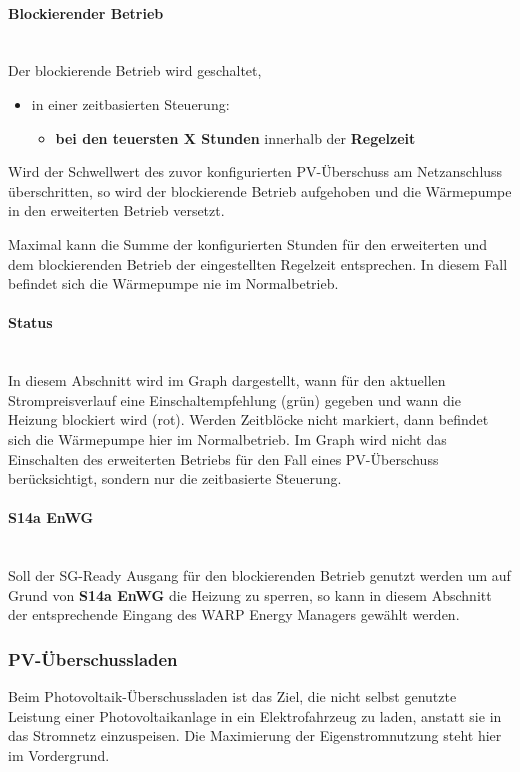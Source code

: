 \documentclass[a4paper,10pt]{article}
\newcommand{\hint}[1]{\begin{tcolorbox}[colback=boxgray,colframe=black,coltext=
white,title=Hinweis,left*=2mm,right*=2mm,boxsep=1mm,bottom=1mm,top=1mm]#1\end{tcolorbox}}
\begin{document}
\begin{multicols*}{2}
    \paragraph{Blockierender Betrieb}\ \\
    Der blockierende Betrieb wird geschaltet,
    \begin{itemize}
    \item in einer zeitbasierten Steuerung:
    \begin{itemize}
    \item \textbf{bei den teuersten X Stunden} innerhalb der \textbf{Regelzeit}
    \end{itemize}
   	\end{itemize}
    Wird der Schwellwert des zuvor konfigurierten PV-Überschuss am Netzanschluss überschritten, so wird der blockierende Betrieb aufgehoben und die Wärmepumpe in den erweiterten Betrieb versetzt.
    
    \hint{Maximal kann die Summe der konfigurierten Stunden für den erweiterten und dem blockierenden Betrieb der eingestellten Regelzeit entsprechen. In diesem Fall befindet sich die Wärmepumpe nie im Normalbetrieb.}
    
    \paragraph{Status}\ \\
    In diesem Abschnitt wird im Graph dargestellt, wann für den aktuellen Strompreisverlauf eine Einschaltempfehlung (grün) gegeben und wann die Heizung blockiert wird (rot). Werden Zeitblöcke nicht markiert, dann befindet sich
    die Wärmepumpe hier im Normalbetrieb. Im Graph wird nicht das Einschalten des erweiterten Betriebs für den Fall eines PV-Überschuss berücksichtigt, sondern nur die zeitbasierte Steuerung.
    
    \paragraph{S14a EnWG}\ \\
    Soll der SG-Ready Ausgang für den blockierenden Betrieb genutzt werden um auf Grund von \textbf{S14a EnWG} die Heizung zu sperren, so kann in diesem Abschnitt der entsprechende Eingang des WARP Energy Managers gewählt werden.

	\subsubsection{PV-Überschussladen}
    Beim Photovoltaik-Überschussladen ist das Ziel, die nicht selbst genutzte Leistung einer
	Photovoltaikanlage in ein
	Elektrofahrzeug zu laden, anstatt sie in das Stromnetz einzuspeisen. Die Maximierung der Eigenstromnutzung steht hier
	im Vordergrund.


\end{multicols*}
\end{document}

